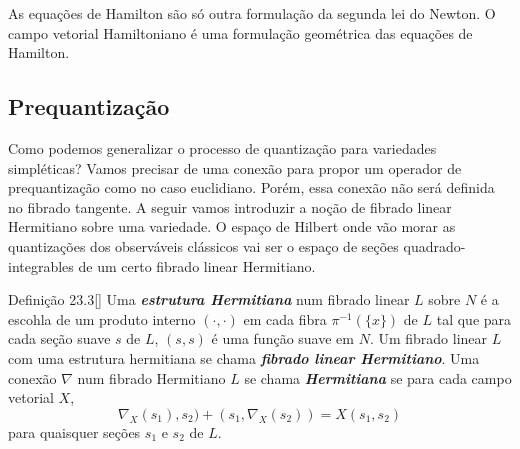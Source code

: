 As equa\c c\~oes de Hamilton s\~ao s\'o outra formula\c c\~ao da segunda lei do Newton. O campo vetorial Hamiltoniano \'e uma formula\c c\~ao geom\'etrica das equa\c c\~oes de Hamilton.

\iffalse
{\color{3}Você tem os seguintes recursos falando sobre \textbf{prequantização}  (quantização em line bundles): \texttt{k3quant.pdf}, \texttt{raw.pdf}, \texttt{chernsimons.pdf}, \texttt{lecnotes.pdf},  \texttt{bere-top.pdf} e \texttt{wood.pdf}. São todos muito boms e tem muitos exemplos simples como esfera de Riemann, toro. \texttt{chernsimons.pdf} tem esse negocio de $\mathsf{SU}(2)$. Só \texttt{k3quant.pdf} fala da definição intuitiva.}

Começarei por presentar uma visão geral dos objetivos da quantizão geométrica. Mais pra frente vamos ver que essa construção não pode ser alcançada per se, e terminharemos desenvolvendo uma outra construção. Para essa noção inuitiva uso \cite{gq} e \cite{k3quant}.

Vou começar seguindo \cite{k3quant} para dar uma visão geral dos objetivos da quântização (isso também está em \href{https://en.wikipedia.org/wiki/Canonical_quantization#Classical_and_quantum_brackets}{Wiki, Canonical Quantization}). Começamos com o caso simples em que $M=\mathbb{R}^{n}$ e $\hslash$ é uma constante (a constante de Planck, que para nós é só um nome).\fi

\subsection{Prequantização}

Como podemos generalizar o processo de quantização para variedades simpléticas? Vamos precisar de uma conexão para propor um operador de prequantização como no caso euclidiano. Porém, essa conexão não será definida no fibrado tangente. A seguir vamos introduzir a noção de fibrado linear Hermitiano sobre uma variedade. O espaço de Hilbert onde vão morar as quantizações dos observáveis clássicos vai ser o espaço de seções quadrado-integrables de um certo fibrado linear Hermitiano.

\begin{thing4}{Definição 23.3}[\cite{hallq}]\leavevmode
Uma  \textit{\textbf{estrutura Hermitiana}} num fibrado linear $L$ sobre $N$ é a escohla de um produto interno $(\cdot,\cdot)$ em cada fibra $\pi^{-1}(\{x\})$ de $L$ tal que para cada seção suave $s$ de $L$, $(s,s)$ é uma função suave em $N$. Um fibrado linear $L$ com uma estrutura hermitiana se chama \textit{\textbf{fibrado linear Hermitiano}}. Uma conexão $\nabla$ num fibrado Hermitiano $L$ se chama \textit{\textbf{Hermitiana}} se para cada campo vetorial $X$,
\[\nabla_X(s_1),s_2)+(s_1,\nabla_X(s_2))=X(s_1,s_2)\]
para quaisquer seções $s_1$ e $s_2$ de $L$.
\end{thing4}

